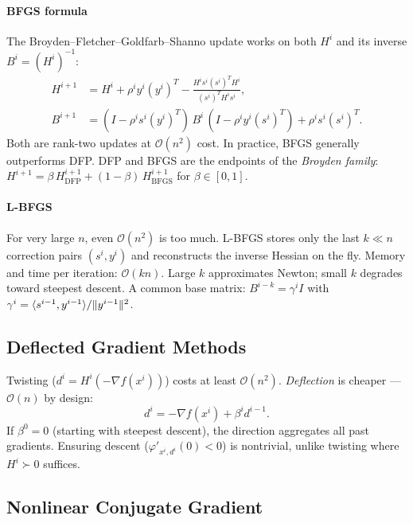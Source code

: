 \paragraph{BFGS formula}

The Broyden--Fletcher--Goldfarb--Shanno update works on both $H^i$ and its inverse $B^i = (H^i)^{-1}$:
\begin{align*}
	H^{i+1} &= H^i + \rho^i y^i (y^i)^T - \frac{H^i s^i (s^i)^T H^i}{(s^i)^T H^i s^i}, \\
	B^{i+1} &= (I - \rho^i s^i (y^i)^T)\, B^i\, (I - \rho^i y^i (s^i)^T) + \rho^i s^i (s^i)^T.
\end{align*}
Both are rank-two updates at $\mathcal{O}(n^2)$ cost.
In practice, BFGS generally outperforms DFP.
DFP and BFGS are the endpoints of the \textit{Broyden family}: $H^{i+1} = \beta\, H^{i+1}_{\mathrm{DFP}} + (1 - \beta)\, H^{i+1}_{\mathrm{BFGS}}$ for $\beta \in [0, 1]$.

\paragraph{L-BFGS}

For very large $n$, even $\mathcal{O}(n^2)$ is too much.
L-BFGS stores only the last $k \ll n$ correction pairs $(s^i, y^i)$ and reconstructs the inverse Hessian on the fly.
Memory and time per iteration: $\mathcal{O}(kn)$.
Large $k$ approximates Newton; small $k$ degrades toward steepest descent.
A common base matrix: $B^{i-k} = \gamma^i I$ with $\gamma^i = \langle s^{i-1}, y^{i-1}\rangle / \lVert y^{i-1}\rVert^2$.


\subsection{Deflected Gradient Methods}\label{ssec:deflected}

Twisting ($d^i = H^i(-\nabla f(x^i))$) costs at least $\mathcal{O}(n^2)$.
\textit{Deflection} is cheaper --- $\mathcal{O}(n)$ by design:
\begin{equation}\label{eq:deflected-gradient}
	d^i = -\nabla f(x^i) + \beta^i d^{i-1}.
\end{equation}
If $\beta^0 = 0$ (starting with steepest descent), the direction aggregates all past gradients.
Ensuring descent ($\varphi'_{x^i, d^i}(0) < 0$) is nontrivial, unlike twisting where $H^i \succ 0$ suffices.


\subsection{Nonlinear Conjugate Gradient}\label{ssec:nonlinear-cg}

